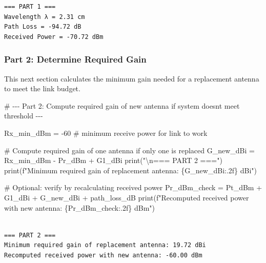 \documentclass[
  letterpaper,
  DIV=11,
  numbers=noendperiod]{scrartcl}
\newenvironment{Shaded}{\begin{snugshade}}{\end{snugshade}}
\newcommand{\BuiltInTok}[1]{\textcolor[rgb]{0.00,0.23,0.31}{#1}}
\newcommand{\CharTok}[1]{\textcolor[rgb]{0.13,0.47,0.30}{#1}}
\newcommand{\CommentTok}[1]{\textcolor[rgb]{0.37,0.37,0.37}{#1}}
\newcommand{\DecValTok}[1]{\textcolor[rgb]{0.68,0.00,0.00}{#1}}
\newcommand{\NormalTok}[1]{\textcolor[rgb]{0.00,0.23,0.31}{#1}}
\newcommand{\OperatorTok}[1]{\textcolor[rgb]{0.37,0.37,0.37}{#1}}
\newcommand{\SpecialCharTok}[1]{\textcolor[rgb]{0.37,0.37,0.37}{#1}}
\newcommand{\SpecialStringTok}[1]{\textcolor[rgb]{0.13,0.47,0.30}{#1}}
\newcommand{\StringTok}[1]{\textcolor[rgb]{0.13,0.47,0.30}{#1}}
\begin{document}
\begin{verbatim}
=== PART 1 ===
Wavelength λ = 2.31 cm
Path Loss = -94.72 dB
Received Power = -70.72 dBm
\end{verbatim}

\subsubsection{Part 2: Determine Required
Gain}\label{part-2-determine-required-gain}

This next section calculates the minimum gain needed for a replacement
antenna to meet the link budget.

\begin{Shaded}
\begin{Highlighting}[]
\CommentTok{\# {-}{-}{-} Part 2: Compute required gain of new antenna if system doesn\textquotesingle{}t meet threshold {-}{-}{-}}

\NormalTok{Rx\_min\_dBm }\OperatorTok{=} \OperatorTok{{-}}\DecValTok{60}  \CommentTok{\# minimum receive power for link to work}

\CommentTok{\# Compute required gain of one antenna if only one is replaced}
\NormalTok{G\_new\_dBi }\OperatorTok{=}\NormalTok{ Rx\_min\_dBm }\OperatorTok{{-}}\NormalTok{ Pr\_dBm }\OperatorTok{+}\NormalTok{ G1\_dBi}
\BuiltInTok{print}\NormalTok{(}\StringTok{"}\CharTok{\textbackslash{}n}\StringTok{=== PART 2 ==="}\NormalTok{)}
\BuiltInTok{print}\NormalTok{(}\SpecialStringTok{f"Minimum required gain of replacement antenna: }\SpecialCharTok{\{}\NormalTok{G\_new\_dBi}\SpecialCharTok{:.2f\}}\SpecialStringTok{ dBi"}\NormalTok{)}

\CommentTok{\# Optional: verify by recalculating received power}
\NormalTok{Pr\_dBm\_check }\OperatorTok{=}\NormalTok{ Pt\_dBm }\OperatorTok{+}\NormalTok{ G1\_dBi }\OperatorTok{+}\NormalTok{ G\_new\_dBi }\OperatorTok{+}\NormalTok{ path\_loss\_dB}
\BuiltInTok{print}\NormalTok{(}\SpecialStringTok{f"Recomputed received power with new antenna: }\SpecialCharTok{\{}\NormalTok{Pr\_dBm\_check}\SpecialCharTok{:.2f\}}\SpecialStringTok{ dBm"}\NormalTok{)}
\end{Highlighting}
\end{Shaded}

\begin{verbatim}

=== PART 2 ===
Minimum required gain of replacement antenna: 19.72 dBi
Recomputed received power with new antenna: -60.00 dBm
\end{verbatim}
\end{document}
